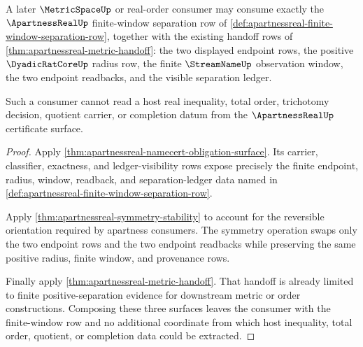 \begin{theorem}
\label{thm:apartnessreal-metric-consumer-separation-boundary}
A later $\MetricSpaceUp$ or real-order consumer may consume exactly the $\ApartnessRealUp$ finite-window separation row of \autoref{def:apartnessreal-finite-window-separation-row}, together with the existing handoff rows of \autoref{thm:apartnessreal-metric-handoff}: the two displayed endpoint rows, the positive $\DyadicRatCoreUp$ radius row, the finite $\StreamNameUp$ observation window, the two endpoint readbacks, and the visible separation ledger.

Such a consumer cannot read a host real inequality, total order, trichotomy decision, quotient carrier, or completion datum from the $\ApartnessRealUp$ certificate surface.
\end{theorem}
\begin{proof}
Apply \autoref{thm:apartnessreal-namecert-obligation-surface}. Its carrier, classifier, exactness, and ledger-visibility rows expose precisely the finite endpoint, radius, window, readback, and separation-ledger data named in \autoref{def:apartnessreal-finite-window-separation-row}.

Apply \autoref{thm:apartnessreal-symmetry-stability} to account for the reversible orientation required by apartness consumers. The symmetry operation swaps only the two endpoint rows and the two endpoint readbacks while preserving the same positive radius, finite window, and provenance rows.

Finally apply \autoref{thm:apartnessreal-metric-handoff}. That handoff is already limited to finite positive-separation evidence for downstream metric or order constructions. Composing these three surfaces leaves the consumer with the finite-window row and no additional coordinate from which host inequality, total order, quotient, or completion data could be extracted.
\end{proof}

